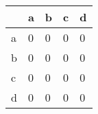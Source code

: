 \begin{tabular}{lllll}
\toprule
{} &  a &  b &  c &  d \\
\midrule
a &  0 &  0 &  0 &  0 \\
b &  0 &  0 &  0 &  0 \\
c &  0 &  0 &  0 &  0 \\
d &  0 &  0 &  0 &  0 \\
\bottomrule
\end{tabular}
